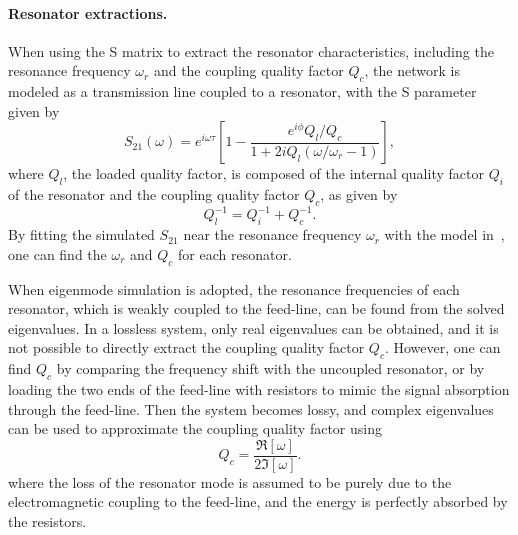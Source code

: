 \documentclass[a4paper,onecolumn,11pt,unpublished]{quantumarticle}
\begin{document}
\paragraph{Resonator extractions.}
When using the S matrix to extract the resonator characteristics, including the resonance frequency $\omega_r$ and the coupling quality factor $Q_c$, the network is modeled as a transmission line coupled to a resonator, with the S parameter given by
\begin{equation}
\label{eq:coupled_resonator_s21}
    S_{21}(\omega) = e^{i \omega \tau} \left [ 1 - \frac{e^{i\phi} Q_l / Q_c}{1+2iQ_l(\omega / \omega_r -1)} \right],
\end{equation}
where $Q_l$, the loaded quality factor, is composed of the internal quality factor $Q_i$ of the resonator and the coupling quality factor $Q_c$, as given by
\begin{equation}
Q_l^{-1} = Q_i^{-1} + Q_c^{-1}.
\end{equation}
By fitting the simulated $S_{21}$ near the resonance frequency $\omega_r$ with the model in~, one can find the $\omega_r$ and $Q_c$ for each resonator.

When eigenmode simulation is adopted, the resonance frequencies of each resonator, which is weakly coupled to the feed-line, can be found from the solved eigenvalues. 
In a lossless system, only real eigenvalues can be obtained, and it is not possible to directly extract the coupling quality factor $Q_c$. However, one can find $Q_c$ by comparing the frequency shift with the uncoupled resonator, or by loading the two ends of the feed-line with resistors to mimic the signal absorption through the feed-line. 
Then the system becomes lossy, and complex eigenvalues can be used to approximate the coupling quality factor using
\begin{equation}
    Q_c = \frac{\Re[\omega]}{2\Im[\omega]}.
\end{equation}
where the loss of the resonator mode is assumed to be purely due to the electromagnetic coupling to the feed-line, and the energy is perfectly absorbed by the resistors. 
\end{document}

